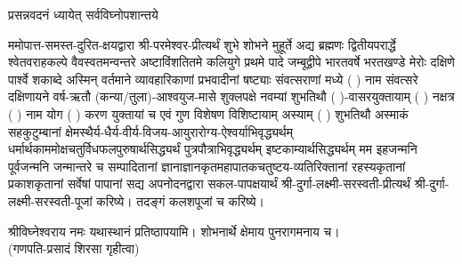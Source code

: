 
\setlength{\parindent}{0pt}


 

{प्रसन्नवदनं ध्यायेत् सर्वविघ्नोपशान्तये}
 

ममोपात्त-समस्त-दुरित-क्षयद्वारा श्री-परमेश्वर-प्रीत्यर्थं शुभे शोभने मुहूर्ते अद्य ब्रह्मणः
द्वितीयपरार्द्धे श्वेतवराहकल्पे वैवस्वतमन्वन्तरे अष्टाविंशतितमे कलियुगे प्रथमे पादे
जम्बूद्वीपे भारतवर्षे भरतखण्डे मेरोः दक्षिणे पार्श्वे शकाब्दे अस्मिन् वर्तमाने व्यावहारिकाणां प्रभवादीनां षष्ट्याः संवत्सराणां मध्ये (  ) नाम संवत्सरे दक्षिणायने 
वर्ष-ऋतौ (कन्या/तुला)-आश्वयुज-मासे शुक्लपक्षे नवम्यां शुभतिथौ ( )-वासरयुक्तायाम्
(  ) नक्षत्र (  ) नाम  योग  ( ) करण युक्तायां च एवं गुण विशेषण विशिष्टायाम्
अस्याम् ( ) शुभतिथौ 
अस्माकं सहकुटुम्बानां क्षेमस्थैर्य-धैर्य-वीर्य-विजय-आयुरारोग्य-ऐश्वर्याभिवृद्ध्यर्थम्
 धर्मार्थकाममोक्ष\-चतुर्विधफलपुरुषार्थसिद्ध्यर्थं पुत्रपौत्राभि\-वृद्ध्यर्थम् इष्टकाम्यार्थसिद्ध्यर्थम्
मम इहजन्मनि पूर्वजन्मनि जन्मान्तरे च सम्पादितानां ज्ञानाज्ञानकृतमहा\-पातकचतुष्टय-व्यतिरिक्तानां रहस्यकृतानां प्रकाशकृतानां सर्वेषां पापानां सद्य अपनोदनद्वारा सकल-पापक्षयार्थं 
श्री-दुर्गा-लक्ष्मी-सरस्वती-प्रीत्यर्थं श्री-दुर्गा-लक्ष्मी-सरस्वती-पूजां करिष्ये।
तदङ्गं कलशपूजां च करिष्ये। 


श्रीविघ्नेश्वराय नमः यथास्थानं प्रतिष्ठापयामि। शोभनार्थे क्षेमाय पुनरागमनाय च।\\
(गणपति-प्रसादं शिरसा गृहीत्वा)













\renewcommand{\devAya}{श्री-दुर्गा-लक्ष्मी-युक्तायै सरस्वत्यै नमः,}



